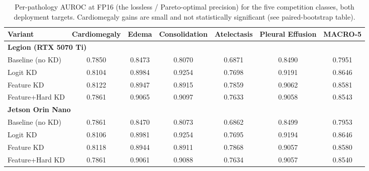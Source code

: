 \begin{table}[t]
\centering
\caption{Per-pathology AUROC at FP16 (the lossless / Pareto-optimal precision) for the five competition classes, both deployment targets. Cardiomegaly gains are small and not statistically significant (see paired-bootstrap table).}
\label{tab:auroc_perclass_fp16}
\begin{tabular}{lcccccc}
\toprule
Variant & Cardiomegaly & Edema & Consolidation & Atelectasis & Pleural Effusion & MACRO-5 \\
\midrule
\multicolumn{7}{l}{\textbf{Legion (RTX 5070 Ti)}} \\
Baseline (no KD) & 0.7850 & 0.8473 & 0.8070 & 0.6871 & 0.8490 & 0.7951 \\
Logit KD & 0.8104 & 0.8984 & 0.9254 & 0.7698 & 0.9191 & 0.8646 \\
Feature KD & 0.8122 & 0.8947 & 0.8915 & 0.7859 & 0.9062 & 0.8581 \\
Feature+Hard KD & 0.7861 & 0.9065 & 0.9097 & 0.7633 & 0.9058 & 0.8543 \\
\midrule
\multicolumn{7}{l}{\textbf{Jetson Orin Nano}} \\
Baseline (no KD) & 0.7861 & 0.8470 & 0.8073 & 0.6862 & 0.8499 & 0.7953 \\
Logit KD & 0.8106 & 0.8981 & 0.9254 & 0.7695 & 0.9194 & 0.8646 \\
Feature KD & 0.8118 & 0.8944 & 0.8911 & 0.7868 & 0.9057 & 0.8580 \\
Feature+Hard KD & 0.7861 & 0.9061 & 0.9088 & 0.7634 & 0.9057 & 0.8540 \\
\bottomrule
\end{tabular}
\end{table}
